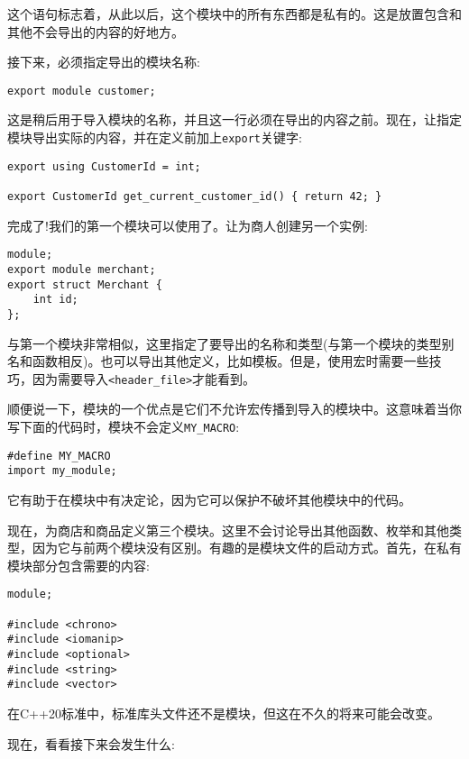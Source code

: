 这个语句标志着，从此以后，这个模块中的所有东西都是私有的。这是放置包含和其他不会导出的内容的好地方。

接下来，必须指定导出的模块名称:

\begin{lstlisting}[style=styleCXX]
export module customer;
\end{lstlisting}

这是稍后用于导入模块的名称，并且这一行必须在导出的内容之前。现在，让指定模块导出实际的内容，并在定义前加上\texttt{export}关键字:

\begin{lstlisting}[style=styleCXX]
export using CustomerId = int;

export CustomerId get_current_customer_id() { return 42; }
\end{lstlisting}

完成了!我们的第一个模块可以使用了。让为商人创建另一个实例:

\begin{lstlisting}[style=styleCXX]
module;
export module merchant;
export struct Merchant {
	int id;
};
\end{lstlisting}

与第一个模块非常相似，这里指定了要导出的名称和类型(与第一个模块的类型别名和函数相反)。也可以导出其他定义，比如模板。但是，使用宏时需要一些技巧，因为需要导入\texttt{<header\_file>}才能看到。

顺便说一下，模块的一个优点是它们不允许宏传播到导入的模块中。这意味着当你写下面的代码时，模块不会定义\texttt{MY\_MACRO}:

\begin{lstlisting}[style=styleCXX]
#define MY_MACRO
import my_module;
\end{lstlisting}

它有助于在模块中有决定论，因为它可以保护不破坏其他模块中的代码。

现在，为商店和商品定义第三个模块。这里不会讨论导出其他函数、枚举和其他类型，因为它与前两个模块没有区别。有趣的是模块文件的启动方式。首先，在私有模块部分包含需要的内容:

\begin{lstlisting}[style=styleCXX]
module;

#include <chrono>
#include <iomanip>
#include <optional>
#include <string>
#include <vector>
\end{lstlisting}

在C++20标准中，标准库头文件还不是模块，但这在不久的将来可能会改变。

现在，看看接下来会发生什么:

